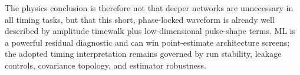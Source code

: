 The physics conclusion is therefore not that deeper networks are unnecessary in
all timing tasks, but that this short, phase-locked waveform is already well
described by amplitude timewalk plus low-dimensional pulse-shape terms.  ML is a
powerful residual diagnostic and can win point-estimate architecture screens;
the adopted timing interpretation remains governed by run stability, leakage
controls, covariance topology, and estimator robustness.

